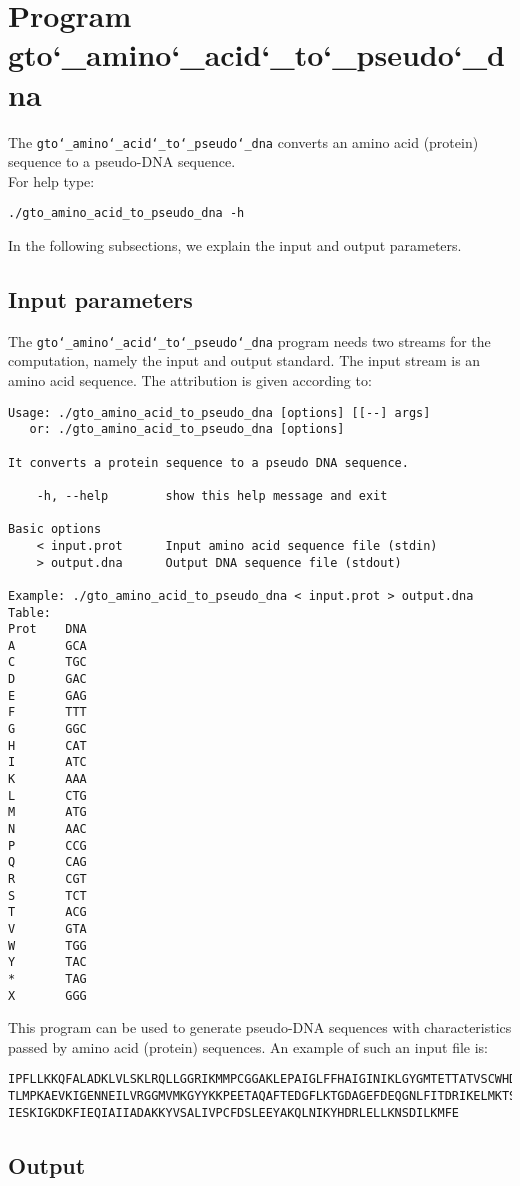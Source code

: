 \section{Program gto\char`_amino\char`_acid\char`_to\char`_pseudo\char`_dna}
The \texttt{gto\char`_amino\char`_acid\char`_to\char`_pseudo\char`_dna} converts an amino acid (protein) sequence to a pseudo-DNA sequence.\\
For help type:
\begin{lstlisting}
./gto_amino_acid_to_pseudo_dna -h
\end{lstlisting}
In the following subsections, we explain the input and output parameters.

\subsection*{Input parameters}

The \texttt{gto\char`_amino\char`_acid\char`_to\char`_pseudo\char`_dna} program needs two streams for the computation, namely the input and output standard. The input stream is an amino acid sequence.
The attribution is given according to:
\begin{lstlisting}
Usage: ./gto_amino_acid_to_pseudo_dna [options] [[--] args]
   or: ./gto_amino_acid_to_pseudo_dna [options]

It converts a protein sequence to a pseudo DNA sequence.

    -h, --help        show this help message and exit

Basic options
    < input.prot      Input amino acid sequence file (stdin)
    > output.dna      Output DNA sequence file (stdout)

Example: ./gto_amino_acid_to_pseudo_dna < input.prot > output.dna
Table:
Prot	DNA
A		GCA
C		TGC
D		GAC
E		GAG
F		TTT
G		GGC
H		CAT
I		ATC
K		AAA
L		CTG
M		ATG
N		AAC
P		CCG
Q		CAG
R		CGT
S		TCT
T		ACG
V		GTA
W		TGG
Y		TAC
*		TAG
X		GGG
\end{lstlisting}
This program can be used to generate pseudo-DNA sequences with characteristics passed by amino acid (protein) sequences. An example of such an input file is:
\begin{lstlisting}
IPFLLKKQFALADKLVLSKLRQLLGGRIKMMPCGGAKLEPAIGLFFHAIGINIKLGYGMTETTATVSCWHDFQFNPNSIG
TLMPKAEVKIGENNEILVRGGMVMKGYYKKPEETAQAFTEDGFLKTGDAGEFDEQGNLFITDRIKELMKTSNGKYIAPQY
IESKIGKDKFIEQIAIIADAKKYVSALIVPCFDSLEEYAKQLNIKYHDRLELLKNSDILKMFE
\end{lstlisting}

\subsection*{Output}

